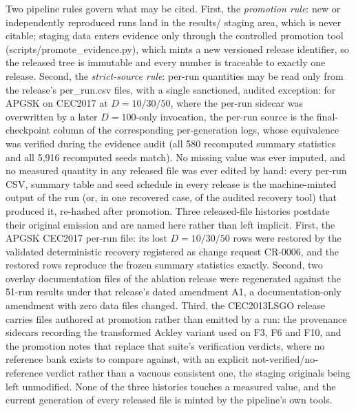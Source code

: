 \documentclass[algorithms,article,submit,moreauthors,pdftex]{Definitions/mdpi}
\newcommand{\apgsk}{APGSK}
\begin{document}
Two pipeline rules govern what may be cited.  First, the
\emph{promotion rule}: new or independently reproduced runs land in the
results/ staging area, which is never citable; staging data
enters evidence only through the controlled promotion tool
(scripts/promote\_evidence.py), which mints a new versioned
release identifier, so the released tree is immutable and every number
is traceable to exactly one release.
Second, the \emph{strict-source rule}: per-run quantities may be read
only from the release's per\_run.csv files, with a single
sanctioned, audited exception: for \apgsk{} on CEC2017 at
$D = 10/30/50$, where the per-run sidecar was overwritten by a later
$D = 100$-only invocation, the per-run source is the final-checkpoint
column of the corresponding per-generation logs, whose equivalence was
verified during the evidence audit (all 580 recomputed summary
statistics and all 5{,}916 recomputed seeds match).
No missing value was ever imputed, and no measured quantity in any
released file was ever edited by hand: every per-run CSV, summary table
and seed schedule in every release is the machine-minted output of the run
(or, in one recovered case, of the audited recovery tool) that
produced it, re-hashed after promotion.  Three released-file histories
postdate their original emission and are named here rather than left
implicit.  First, the \apgsk{} CEC2017 per-run file: its lost
$D = 10/30/50$ rows were restored by the validated deterministic recovery
registered as change request CR-0006, and the restored rows reproduce the
frozen summary statistics exactly.  Second, two overlay documentation
files of the ablation release were regenerated against the 51-run results
under that release's dated amendment A1, a documentation-only
amendment with zero data files changed.  Third, the CEC2013LSGO release
carries files authored at promotion rather than emitted by a run: the
provenance sidecars recording the transformed Ackley variant used on F3,
F6 and F10, and the promotion notes that replace that suite's
verification verdicts, where no reference bank exists to compare against,
with an explicit not-verified/no-reference verdict rather than a vacuous
consistent one, the staging originals being left unmodified.  None of the
three histories touches a measured value, and the current generation of
every released file is minted by the pipeline's own tools.
\end{document}
